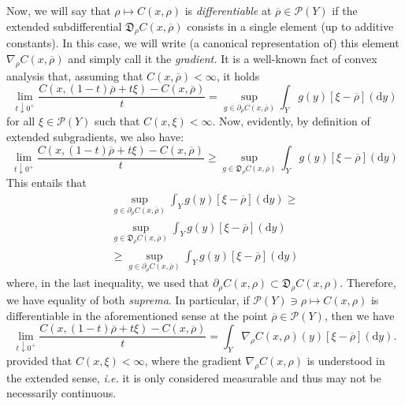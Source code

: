 \documentclass[leqno, 11pt, a4paper]{amsart}
\theoremstyle{definition}
\newcommand{\cP}{\mathcal{P}}
\newcommand{\dd}{\mathrm{d}}
\begin{document}
Now, we will say that $\rho \mapsto C(x, \rho)$ is \textit{differentiable} at $\overline{\rho} \in \cP(Y)$ if the extended subdifferential $\mathfrak{D}_\rho C(x, \overline{\rho})$ consists in a single element (up to additive constants). In this case, we will write (a canonical representation of) this element $\nabla_\rho C(x, \overline{\rho})$ and simply call it the\textit{ gradient.} It is a well-known fact of convex analysis that, assuming that $C(x, \overline{\rho}) < \infty$, it holds 
$$
\lim_{t \downarrow 0^+} \frac{C(x, (1-t)\overline{\rho} + t \xi) - C(x, \overline{\rho})}{t} = \sup_{g \in \partial_\rho C(x, \overline{\rho})}\int_{Y} g(y)[\xi - \overline{\rho}](\dd y)
$$
for all $\xi \in \cP(Y)$ such that $C(x, \xi) < \infty$. Now, evidently, by definition of extended subgradients, we also have:
$$
\lim_{t \downarrow 0^+} \frac{C(x, (1-t)\overline{\rho} + t \xi) - C(x, \overline{\rho})}{t} \geq  \sup_{g \in \mathfrak{D}_\rho C(x, \overline{\rho})}\int_{Y} g(y)[\xi - \overline{\rho}](\dd y)
$$
This entails that 
\begin{multline*}
\sup_{g \in \partial_\rho C(x, \overline{\rho})}\int_{Y} g(y)[\xi - \overline{\rho}](\dd y) \geq \\ \sup_{g \in \mathfrak{D}_\rho C(x, \overline{\rho})}\int_{Y} g(y)[\xi - \overline{\rho}](\dd y)\\ \geq \sup_{g \in \partial_\rho C(x, \overline{\rho})}\int_{Y} g(y)[\xi - \overline{\rho}](\dd y)
\end{multline*}
where, in the last inequality, we used that $\partial_\rho C(x, \rho) \subset \mathfrak{D}_\rho C(x, \rho)$. Therefore, we have equality of both \textit{suprema}. In particular, if $\cP(Y) \ni \rho \mapsto C(x, \rho)$ is differentiable in the aforementioned sense at the point $\overline{\rho} \in \cP(Y)$, then we have
\begin{equation}\label{eq:gat-diff-C-x}
\lim_{t \downarrow 0^+} \frac{C(x, (1-t)\overline{\rho} + t \xi) - C(x, \overline{\rho})}{t} = \int_{Y} \nabla_\rho C(x, \rho)(y) [\xi - \overline{\rho}](\dd y).
\end{equation}
provided that $C(x, \xi) < \infty$, where the gradient $\nabla_\rho C(x, \rho)$ is understood in the extended sense, \textit{i.e.} it is only considered measurable and thus may not be necessarily continuous.
\end{document}
